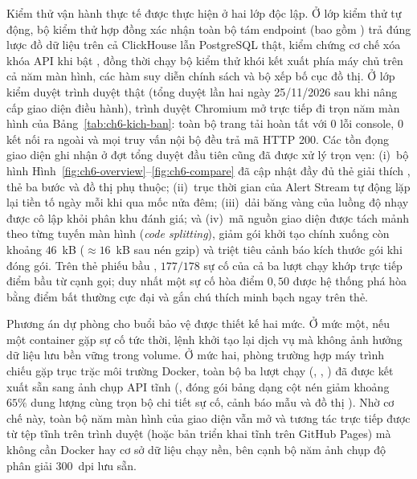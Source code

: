 Kiểm thử vận hành thực tế được thực hiện ở hai lớp độc lập. Ở lớp kiểm thử tự động, bộ kiểm thử hợp đồng xác nhận toàn bộ tám endpoint (bao gồm ) trả đúng lược đồ dữ liệu trên cả ClickHouse lẫn PostgreSQL thật, kiểm chứng cơ chế xóa khóa API khi bật , đồng thời chạy bộ kiểm thử khói kết xuất phía máy chủ trên cả năm màn hình, các hàm suy diễn chính sách  và bộ xếp bố cục đồ thị. Ở lớp kiểm duyệt trình duyệt thật (tổng duyệt lần hai ngày 25/11/2026 sau khi nâng cấp giao diện điều hành), trình duyệt Chromium mở trực tiếp  đi trọn năm màn hình của Bảng~\ref{tab:ch6-kich-ban}: toàn bộ trang tải hoàn tất với $0$ lỗi console, $0$ kết nối ra ngoài  và mọi truy vấn nội bộ đều trả mã HTTP 200. Các tồn đọng giao diện ghi nhận ở đợt tổng duyệt đầu tiên cũng đã được xử lý trọn vẹn: (i)~bộ hình Hình~\ref{fig:ch6-overview}--\ref{fig:ch6-compare} đã cập nhật đầy đủ thẻ giải thích , thẻ ba bước  và đồ thị phụ thuộc; (ii)~trục thời gian của Alert Stream tự động lặp lại tiền tố ngày  mỗi khi qua mốc nửa đêm; (iii)~dải băng vàng của luồng độ nhạy được cô lập khỏi phân khu đánh giá; và (iv)~mã nguồn giao diện được tách mảnh theo từng tuyến màn hình (\emph{code splitting}), giảm gói khởi tạo chính xuống còn khoảng $46$~kB ($\approx 16$~kB sau nén gzip) và triệt tiêu cảnh báo kích thước gói khi đóng gói. Trên thẻ phiếu bầu , $177/178$ sự cố của cả ba lượt chạy khớp trực tiếp điểm bầu từ cạnh gọi; duy nhất một sự cố hòa điểm $0{,}50$ được hệ thống phá hòa bằng điểm bất thường cực đại và gắn chú thích minh bạch ngay trên thẻ.

Phương án dự phòng cho buổi bảo vệ được thiết kế hai mức. Ở mức một, nếu một container gặp sự cố tức thời, lệnh  khởi tạo lại dịch vụ mà không ảnh hưởng dữ liệu lưu bền vững trong volume. Ở mức hai, phòng trường hợp máy trình chiếu gặp trục trặc môi trường Docker, toàn bộ ba lượt chạy (, , ) đã được kết xuất sẵn sang ảnh chụp API tĩnh (, đóng gói bảng  dạng cột nén giảm khoảng $65\%$ dung lượng cùng trọn bộ chi tiết sự cố, cảnh báo mẫu và đồ thị ). Nhờ cơ chế này, toàn bộ năm màn hình của giao diện vẫn mở và tương tác trực tiếp được từ tệp tĩnh trên trình duyệt (hoặc bản triển khai tĩnh trên GitHub Pages) mà không cần Docker hay cơ sở dữ liệu chạy nền, bên cạnh bộ năm ảnh chụp độ phân giải 300~dpi lưu sẵn.

